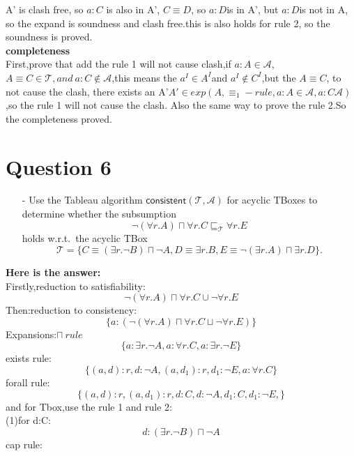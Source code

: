 \documentclass{article}
\begin{document}
    A' is clash free, so $a:C$ is also in A', $C\equiv D$, so $a:D$is in A', but $a:D$is not in  A, so the expand is soundness and clash free.this is also holds for 
    rule 2, so the soundness is proved.\\
    \textbf{completeness}\\
    First,prove that add the rule 1 will not cause clash,if $a:A \in \mathcal{A}$,$A\equiv C\in \mathcal{T},and\ a:C \notin \mathcal{A}$,this means the $a^I\in A^I$and $a^I \notin C^I$,but the $A\equiv C$, to
    not cause the clash, there exists an A'$A' \in exp(A,\equiv_1-rule, a:A\in \mathcal{A}, a:C\mathcal{A})$,so the rule 1 will not cause the clash. Also the same way to prove the rule 2.So the completeness proved.\\

    \section{Question 6}
    \begin{itemize}
        \item[-] Use the Tableau algorithm $\textsf{consistent}(\mathcal{T},\mathcal{A})$ for acyclic TBoxes to determine whether the subsumption
        \[\neg(\forall r.A)\sqcap\forall r.C\sqsubseteq_{\mathcal{T}}\forall r.E\]holds w.r.t.\ the acyclic TBox
        \[\mathcal{T}=\{C\equiv(\exists r.\neg B)\sqcap\neg A, D\equiv\exists r.B, E\equiv\neg(\exists r.A)\sqcap\exists r.D\}.\]
    \end{itemize}
    \textbf{Here is the answer:}\\
    Firstly,reduction to satisfiability:\\
    \[
        \neg(\forall r.A)\sqcap\forall r.C\cup \neg\forall r.E
    \]
    Then:reduction to consistency:\\
    \[
        \{a:(\neg(\forall r.A)\sqcap\forall r.C\sqcup \neg\forall r.E)\}  
    \]  
    Expansions:$\sqcap\ rule$\\
    \[
        \{a:\exists r.\neg A,a:\forall r.C,a:\exists r.\neg E\}  
    \]
    exists rule:\\
    \[
        \{(a,d):r,d:\neg A, (a,d_1):r,d_1:\neg E,a:\forall r.C\}  
    \]
    forall rule:\\
    \[
        \{(a,d):r,(a,d_1):r,d:C,d:\neg A,d_1:C,d_1:\neg E, \}  
    \]
    and for Tbox,use the rule 1 and rule 2:\\
    (1)for d:C:\\
    \[
        d:(\exists r.\neg B)\sqcap\neg A
    \]
    cap rule:\\
\end{document}
